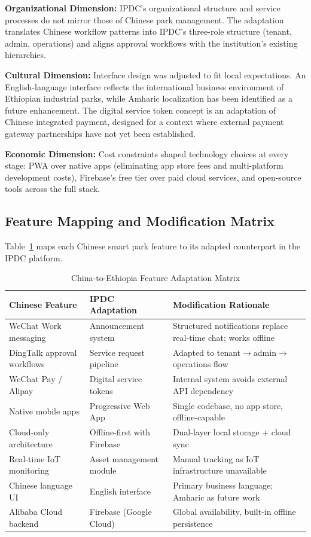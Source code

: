 \textbf{Organizational Dimension:} IPDC's organizational structure and service processes do not mirror those of Chinese park management. The adaptation translates Chinese workflow patterns into IPDC's three-role structure (tenant, admin, operations) and aligns approval workflows with the institution's existing hierarchies.

\textbf{Cultural Dimension:} Interface design was adjusted to fit local expectations. An English-language interface reflects the international business environment of Ethiopian industrial parks, while Amharic localization has been identified as a future enhancement. The digital service token concept is an adaptation of Chinese integrated payment, designed for a context where external payment gateway partnerships have not yet been established.

\textbf{Economic Dimension:} Cost constraints shaped technology choices at every stage: PWA over native apps (eliminating app store fees and multi-platform development costs), Firebase's free tier over paid cloud services, and open-source tools across the full stack.

\subsection{Feature Mapping and Modification Matrix}

Table~\ref{tab:adaptation-matrix} maps each Chinese smart park feature to its adapted counterpart in the IPDC platform.

\begin{table}[H]
\centering
\caption{China-to-Ethiopia Feature Adaptation Matrix}
\label{tab:adaptation-matrix}
\small
\begin{tabular}{p{3.5cm}p{3.5cm}p{5cm}}
\toprule
\textbf{Chinese Feature} & \textbf{IPDC Adaptation} & \textbf{Modification Rationale} \\
\midrule
WeChat Work messaging & Announcement system & Structured notifications replace real-time chat; works offline \\
DingTalk approval workflows & Service request pipeline & Adapted to tenant$\rightarrow$admin$\rightarrow$operations flow \\
WeChat Pay / Alipay & Digital service tokens & Internal system avoids external API dependency \\
Native mobile apps & Progressive Web App & Single codebase, no app store, offline-capable \\
Cloud-only architecture & Offline-first with Firebase & Dual-layer local storage + cloud sync \\
Real-time IoT monitoring & Asset management module & Manual tracking as IoT infrastructure unavailable \\
Chinese language UI & English interface & Primary business language; Amharic as future work \\
Alibaba Cloud backend & Firebase (Google Cloud) & Global availability, built-in offline persistence \\
\bottomrule
\end{tabular}
\end{table}

